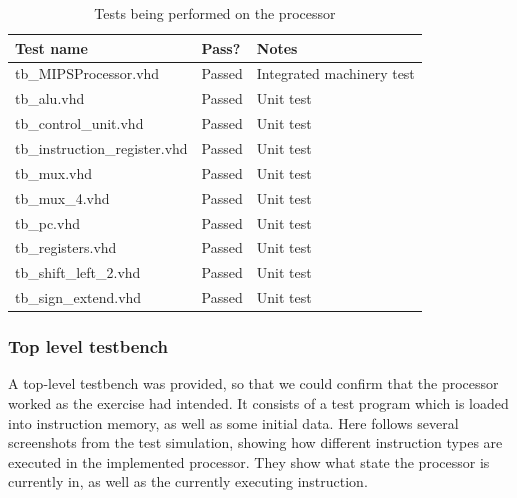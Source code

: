 \begin{table}[ht+]
    \centering
    \begin{tabular}{|l|l|l|}
        \hline
        \textbf{Test name}            & \textbf{Pass?} & \textbf{Notes}            \\ \hline
        tb\_MIPSProcessor.vhd         & Passed         & Integrated machinery test \\ \hline
        tb\_alu.vhd                   & Passed         & Unit test                 \\ \hline
        tb\_control\_unit.vhd         & Passed         & Unit test                 \\ \hline
        tb\_instruction\_register.vhd & Passed         & Unit test                 \\ \hline
        tb\_mux.vhd                   & Passed         & Unit test                 \\ \hline
        tb\_mux\_4.vhd                & Passed         & Unit test                 \\ \hline
        tb\_pc.vhd                    & Passed         & Unit test                 \\ \hline
        tb\_registers.vhd             & Passed         & Unit test                 \\ \hline
        tb\_shift\_left\_2.vhd        & Passed         & Unit test                 \\ \hline
        tb\_sign\_extend.vhd          & Passed         & Unit test                 \\ \hline
    \end{tabular}
    \caption{Tests being performed on the processor}
    \label{tab:tests}
\end{table}

\subsubsection{Top level testbench}

A top-level testbench was provided, so that we could confirm that the processor worked as the exercise had intended.
It consists of a test program which is loaded into instruction memory, as well as some initial data.
Here follows several screenshots from the test simulation, showing how different instruction types are executed in the implemented processor.
They show what state the processor is currently in, as well as the currently executing instruction.

